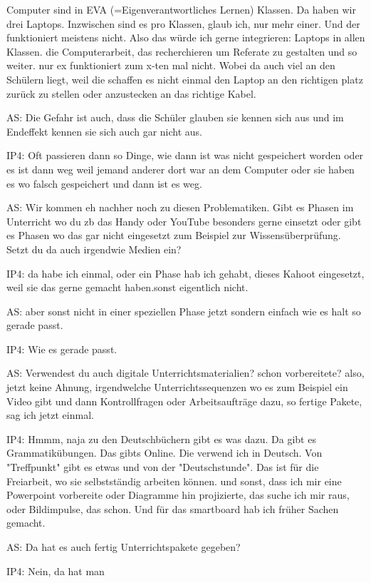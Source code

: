 \documentclass[fontsize=11pt,paper=a4]{scrbook}
\begin{document}
{\begin{itemize*}
Computer sind in EVA (=Eigenverantwortliches Lernen) Klassen. Da haben wir drei Laptops. Inzwischen sind es pro Klassen, glaub ich, nur mehr einer. Und der funktioniert meistens nicht. Also das würde ich gerne integrieren: Laptops in allen Klassen. die Computerarbeit, das
recherchieren um Referate zu gestalten
und so weiter. nur ex funktioniert zum
x-ten mal nicht. Wobei da auch viel an den Schülern liegt, weil die schaffen es
nicht einmal den Laptop an den
richtigen platz zurück zu stellen oder anzustecken an das richtige Kabel.
\item[AS:] Die Gefahr ist auch, dass die Schüler glauben sie kennen sich aus
und im Endeffekt kennen sie sich auch gar nicht aus.
\item[IP4:] Oft passieren dann so Dinge, wie dann
ist was nicht gespeichert worden oder es ist dann weg weil jemand anderer dort
war an dem Computer  oder sie haben es wo falsch gespeichert und dann ist es weg.
\item[AS:] Wir kommen eh nachher noch zu diesen Problematiken. Gibt 
es Phasen im Unterricht wo du  zb das
Handy oder YouTube besonders gerne
einsetzt oder gibt es Phasen wo das gar
nicht eingesetzt zum Beispiel zur Wissensüberprüfung. Setzt du da auch irgendwie
Medien ein?
\item[IP4:] da habe ich einmal, oder ein Phase hab ich gehabt, dieses Kahoot eingesetzt, weil sie das gerne gemacht haben.sonst eigentlich nicht.
\item[AS:]
aber sonst nicht in einer speziellen
Phase jetzt sondern einfach wie es halt
so gerade passt. 
\item[IP4:] Wie es gerade passt.
\item[AS:] Verwendest du auch digitale Unterrichtsmaterialien? schon
vorbereitete? also, jetzt keine Ahnung,
irgendwelche Unterrichtssequenzen wo es
zum Beispiel ein Video gibt und dann
Kontrollfragen oder Arbeitsaufträge dazu, so fertige Pakete, sag ich jetzt einmal.
\item[IP4:] Hmmm, naja zu den Deutschbüchern gibt es was dazu. Da gibt es Grammatikübungen. Das gibts Online. Die verwend ich in Deutsch. Von "Treffpunkt" gibt es etwas und von der "Deutschstunde". Das ist für die Freiarbeit, wo sie selbstständig arbeiten können.
und sonst, dass ich mir eine Powerpoint vorbereite oder
Diagramme hin projizierte, das suche ich mir
raus, oder Bildimpulse,  das schon.
Und für das smartboard hab ich früher
Sachen gemacht. 
\item[AS:] Da hat es auch fertig Unterrichtspakete gegeben?
\item[IP4:] Nein, da hat man

\end{itemize*}}
\end{document}
